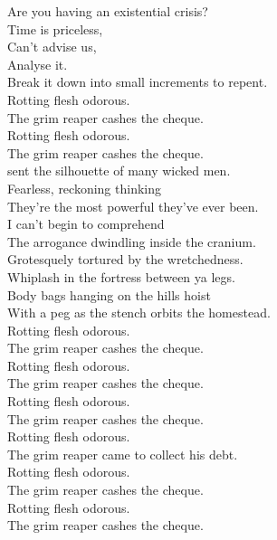 Are you having an existential crisis? \\
Time is priceless, \\
Can't advise us, \\
Analyse it. \\
Break it down into small increments to repent. \\

Rotting flesh odorous. \\
The grim reaper cashes the cheque. \\
Rotting flesh odorous. \\
The grim reaper cashes the cheque. \\

 sent the silhouette of many wicked men. \\
Fearless, reckoning thinking \\
They're the most powerful they've ever been. \\
I can't begin to comprehend \\
The arrogance dwindling inside the cranium. \\

Grotesquely tortured by the wretchedness. \\
Whiplash in the fortress between ya legs. \\
Body bags hanging on the hills hoist \\
With a peg as the stench orbits the homestead. \\

Rotting flesh odorous. \\
The grim reaper cashes the cheque. \\
Rotting flesh odorous. \\
The grim reaper cashes the cheque. \\
Rotting flesh odorous. \\
The grim reaper cashes the cheque. \\
Rotting flesh odorous. \\
The grim reaper came to collect his debt. \\

Rotting flesh odorous. \\
The grim reaper cashes the cheque. \\
Rotting flesh odorous. \\
The grim reaper cashes the cheque. \\


